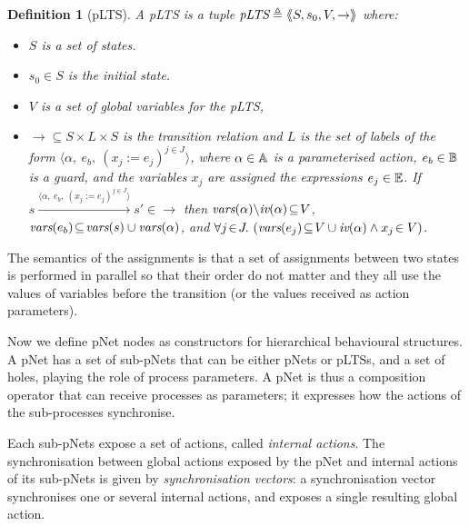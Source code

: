 \documentclass{lmcs}
\newcommand{\LUDO}[1]{\textcolor{darkgreen}{#1}}
\newtheorem{definition}{Definition}
\begin{document}
\begin{definition}[pLTS]
\label{pLTS}
A pLTS is a tuple
$\pLTS\triangleq\mylangle S,s_0, V, \to\myrangle$ where:
\begin{itemize}
\item[$\bullet$]
$S$ is a set of states.
\item[$\bullet$]
$s_0 \in S$ is the initial state.
\item[$\bullet$] $V$ is a set of global variables for the pLTS,
\item[$\bullet$] $\to \subseteq S \times L \times S$ is the transition relation and 
$L$ is the set of labels of the form
$\langle \alpha,~e_b,~(x_j\!:= {e}_j)^{j\in J}\rangle$,
where $\alpha \in\mathbb{A}$ is a parameterised action, $e_b \in
\mathbb{B}$ is a guard, and the variables $x_j$ 
are assigned the expressions $e_j\in \mathbb{E}$.
If 
$s \xrightarrow{\langle \alpha,~e_b,~(x_j\!:= {e}_j)^{j\in
		J}\rangle} s'\in \to $ then 
		$\vars(\alpha)\backslash \iv(\alpha)\!\subseteq\! V$, 
		$\vars(e_b)\!\subseteq\! \vars(s)\cup\vars(\alpha)$, and
		$\forall j\!\in\! J .\,\left(\vars(e_j)\!\subseteq\! V\cup\iv(\alpha)\land 
		x_j\!\in V \right)$. %

\end{itemize}
\end{definition}

The semantics of the assignments is that a set of assignments between two states is performed in parallel so that their order do not matter and they all use the values of variables before the transition (or the values received as action parameters).


Now we define
pNet nodes as constructors for hierarchical behavioural structures.
A pNet has a set of sub-pNets that can be either pNets or pLTSs, and a
set of holes, playing the role of process parameters. A pNet is thus a composition operator that can receive processes as parameters; it expresses how the actions of the sub-processes synchronise.

Each sub-pNets expose
a set of actions, called \emph{internal actions}. The synchronisation between global actions exposed by the pNet and
internal actions of its sub-pNets is given by  \emph{synchronisation vectors}: a
synchronisation vector synchronises one or several internal actions, and
exposes a single resulting global action.
\end{document}
